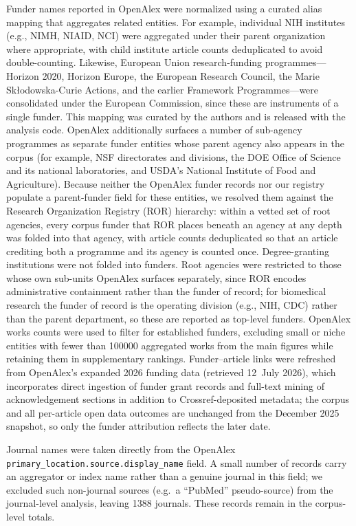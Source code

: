 Funder names reported in OpenAlex were normalized using a curated alias mapping that aggregates related entities. For example, individual NIH institutes (e.g., NIMH, NIAID, NCI) were aggregated under their parent organization where appropriate, with child institute article counts deduplicated to avoid double-counting. Likewise, European Union research-funding programmes---Horizon 2020, Horizon Europe, the European Research Council, the Marie Sk{\l}odowska-Curie Actions, and the earlier Framework Programmes---were consolidated under the European Commission, since these are instruments of a single funder. This mapping was curated by the authors and is released with the analysis code. OpenAlex additionally surfaces a number of sub-agency programmes as separate funder entities whose parent agency also appears in the corpus (for example, NSF directorates and divisions, the DOE Office of Science and its national laboratories, and USDA's National Institute of Food and Agriculture). Because neither the OpenAlex funder records nor our registry populate a parent-funder field for these entities, we resolved them against the Research Organization Registry (ROR) hierarchy: within a vetted set of root agencies, every corpus funder that ROR places beneath an agency at any depth was folded into that agency, with article counts deduplicated so that an article crediting both a programme and its agency is counted once. Degree-granting institutions were not folded into funders. Root agencies were restricted to those whose own sub-units OpenAlex surfaces separately, since ROR encodes administrative containment rather than the funder of record; for biomedical research the funder of record is the operating division (e.g., NIH, CDC) rather than the parent department, so these are reported as top-level funders. OpenAlex works counts were used to filter for established funders, excluding small or niche entities with fewer than \num{100000} aggregated works from the main figures while retaining them in supplementary rankings. Funder--article links were refreshed from OpenAlex's expanded 2026 funding data (retrieved 12~July 2026), which incorporates direct ingestion of funder grant records and full-text mining of acknowledgement sections in addition to Crossref-deposited metadata; the corpus and all per-article open data outcomes are unchanged from the December 2025 snapshot, so only the funder attribution reflects the later date.

Journal names were taken directly from the OpenAlex \texttt{primary\_location.source.display\_name} field. A small number of records carry an aggregator or index name rather than a genuine journal in this field; we excluded such non-journal sources (e.g.\ a ``PubMed'' pseudo-source) from the journal-level analysis, leaving \num{1388} journals. These records remain in the corpus-level totals.

